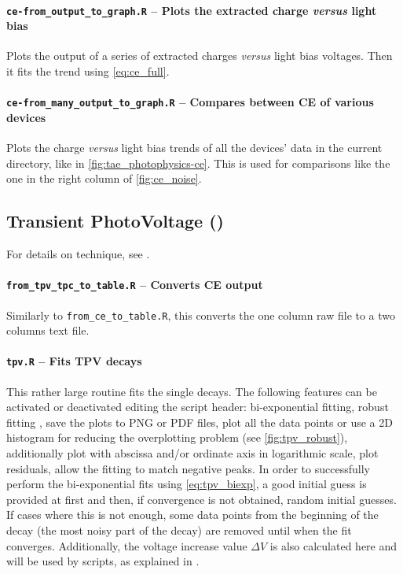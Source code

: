 		\paragraph{\texttt{ce-\-from\_output\_to\_graph.R} -- Plots the extracted charge \textsl{versus} light bias}
		Plots the output of a series of extracted charges \textsl{versus} light bias voltages.
		Then it fits the trend using \cref{eq:ce_full}.

		\paragraph{\texttt{ce-\-from\_many\_output\_to\_graph.R} -- Compares between CE of various devices}
		Plots the charge \textsl{versus} light bias trends of all the devices' data in the current directory, like in \cref{fig:tae_photophysics-ce}.
		This is used for comparisons like the one in the right column of \cref{fig:ce_noise}.

	\subsection{Transient PhotoVoltage ()}\label{r_tpv}
		For details on  technique, see .

		\paragraph{\texttt{from\_tpv\_tpc\_to\_table.R} -- Converts CE output}
		Similarly to \texttt{from\_ce\_to\_table.R}, this converts the one column raw file to a two columns text file.

		\paragraph{\texttt{tpv.R} -- Fits TPV decays}
		This rather large routine fits the single  decays.
		The following features can be activated or deactivated editing the script header:
		bi-exponential fitting, robust fitting \cite{Maechler2018}, save the plots to PNG or PDF files, plot all the data points or use a 2D histogram for reducing the overplotting problem (see \cref{fig:tpv_robust}), additionally plot with abscissa and/or ordinate axis in logarithmic scale, plot residuals, allow the fitting to match negative peaks.
		In order to successfully perform the bi-exponential fits using \cref{eq:tpv_biexp}, a good initial guess is provided at first and then, if convergence is not obtained, random initial guesses.
		If cases where this is not enough, some data points from the beginning of the decay (the most noisy part of the decay) are removed until when the fit converges.
		Additionally, the voltage increase value $\Delta V$ is also calculated here and will be used by  scripts, as explained in .

